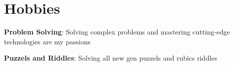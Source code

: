 \documentclass[letterpaper,11pt]{article}
\newcommand{\resumeSubHeadingListStart}{
  \begin{list}{}{
    \setlength\leftmargin{0pt} %
    \setlength\itemindent{0pt} %
    \setlength\itemsep{-3pt}   %
    \setlength\parskip{0pt}    %
  }
}
\newcommand{\resumeSubHeadingListEnd}{\end{list}}
\begin{document}
\section{Hobbies}

   \resumeSubHeadingListStart
        \item{\textbf{Problem Solving}{: Solving complex problems and mastering cutting-edge technologies are my passions}}
        \item{\textbf{Puzzels and Riddles}{: Solving all new gen puzzels and rubics riddles }}
 
   \resumeSubHeadingListEnd
\end{document}
